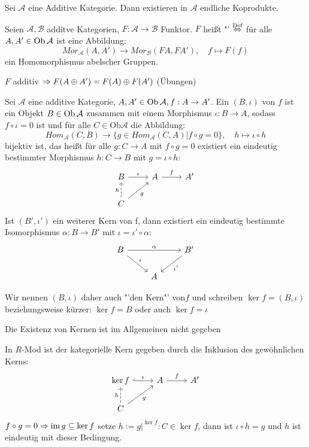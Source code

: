\begin{fo}\label{5.12}
	Sei $\mathcal{A} $ eine Additive Kategorie. Dann existieren in $\mathcal{A} $  endliche Koprodukte. 
\end{fo}
\begin{df}\label{5.13}
	Seien $ \mathcal{A}, \mathcal{B} $ additve Kategorien, $F: \mathcal{A} \to \mathcal{B}$ Funktor.
	 $F$ heißt  "' $\overset{\text{Def}}{\Leftrightarrow} $ für alle $ A, A' \in \text{Ob}\,\mathcal{A} $ ist eine Abbildung: $$ Mor_{\mathcal{A}}(A,A') \to  Mor_{\mathcal{B}}(FA,FA'), \quad f \mapsto F(f) $$ ein Homomorphismus abelscher Gruppen.
\end{df}
\begin{anm}
	$F$ additiv $\Rightarrow  F(A \oplus A' ) = F(A) \oplus F(A') $ (Übungen)
\end{anm}
\begin{bem+df}\label{5.14}
	Sei $ \mathcal{A}$  eine additive Kategorie, $ A,A' \in \text{Ob}\,\mathcal{A}, f: A \to A' $. Ein  $(B,\iota) $ von $f$ ist ein Objekt $ B \in \text{Ob}\,\mathcal{A}$ zusammen mit einem Morphismus $ \iota: B \to A $, sodass $ f \circ \iota = 0 $ ist und für alle $ C \in$Ob$\mathcal{A}$  die Abbildung: $$Hom_{\mathcal{A}}(C,B) \longrightarrow \{g \in Hom_{\mathcal{A}}(C,A) | f \circ g = 0 \}, \quad h \mapsto \iota \circ h $$ bijektiv ist, das heißt für alle $g:C \to A $ mit $ f \circ g = 0 $ existiert ein eindeutig bestimmter Morphismus $ h: C \to B $ mit $ g = \iota \circ h$:
	$$\begin{tikzcd}
	B \arrow{r}{\iota}  & A \arrow{r}{f} & A' \\
	C \arrow[swap]{ur}{g}\arrow[dashed]{u}{h}
	\end{tikzcd}$$
	Ist $(B',\iota') $ ein weiterer Kern von f, dann existiert ein eindeutig bestimmte Isomorphismus $ \alpha: B \to B' $ mit $ \iota = \iota' \circ \alpha$:
	$$\begin{tikzcd}
	B\arrow{rr}{\alpha} \arrow{dr}{\iota} & & B'\arrow{dl}{\iota'}\\
	& A &
	\end{tikzcd}$$
	
	Wir nennen $(B,\iota) $ daher auch "'den Kern"' von$f$ und schreiben $ \ker f= (B,\iota)$ beziehungsweise kürzer: $ \ker f= B $ oder auch $\ker f = \iota$
\end{bem+df}
\begin{anm}
	Die Existenz von Kernen ist im Allgemeinen nicht gegeben
\end{anm}
\begin{bsp}
	In $R$-Mod ist der kategorielle Kern gegeben durch die Inklusion des gewöhnlichen Kerns:
	$$\begin{tikzcd}
	\ker f \arrow[hook]{r}{\iota} & A \arrow{r}{f} & A'\\C \arrow[swap]{ur}{g}\arrow[dashed]{u}{h}
	\end{tikzcd}$$
	$ f \circ g = 0 \Rightarrow \operatorname{im} g \subseteq \ker f $ setze  $ h := g\big|^{\ker f}:  C \in \ker f$, dann ist $ \iota\circ h = g $ und $h$ ist eindeutig mit dieser Bedingung.
\end{bsp}
